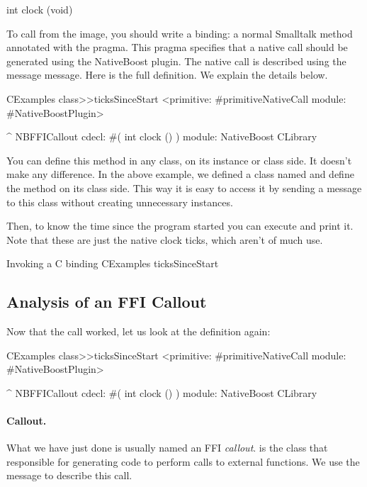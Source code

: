 \documentclass[a4paper,10pt,twoside]{book}
\begin{document}
\begin{code}{}
int clock (void)
\end{code}

To call  from the image, you should write a binding: a normal Smalltalk method annotated with the  pragma. This pragma specifies that a native call should be generated using the NativeBoost plugin. The native call is described using the message  message. Here is the full definition. We  explain the details below.

\begin{code}{}
CExamples class>>ticksSinceStart
	<primitive: #primitiveNativeCall module: #NativeBoostPlugin>
	
	^ NBFFICallout cdecl: #( int clock () ) module: NativeBoost CLibrary
\end{code}



You can define this method in any class, on its instance or class side.
It doesn't make any difference. In the above example, we defined a class named  and define the method on its class side. This way it is easy to access it by sending a message to this class without creating unnecessary instances. 

Then, to know the time since the program started you can execute and print it.
Note that these are just the native clock ticks, which aren't of much use. 
\begin{script}{Invoking a C binding}
CExamples ticksSinceStart
\end{script}


\subsection{Analysis of an FFI Callout}
Now that the call worked, let us look at the definition again:

\begin{code}{}
CExamples class>>ticksSinceStart
	<primitive: #primitiveNativeCall module: #NativeBoostPlugin>
	
	^ NBFFICallout cdecl: #( int clock () ) module: NativeBoost CLibrary
\end{code}

\paragraph{Callout.}
What we have just done is usually named an FFI \emph{callout}.   is the class that responsible for generating code to
perform calls to external functions. We use the  message  to describe this call. 
\end{document}
